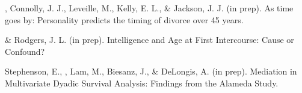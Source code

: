 \item\meb, Connolly, J. J., Leveille, M., Kelly, E. L., \& Jackson, J. J. (in prep). As time goes by: Personality predicts the timing of divorce over 45 years. %
\item\meb \& Rodgers, J. L. (in prep). Intelligence and Age at First Intercourse: Cause or Confound?%
\item Stephenson, E., \meb, Lam, M., Biesanz, J., \& DeLongis, A. (in prep). Mediation in Multivariate Dyadic Survival Analysis: Findings from the Alameda Study. %